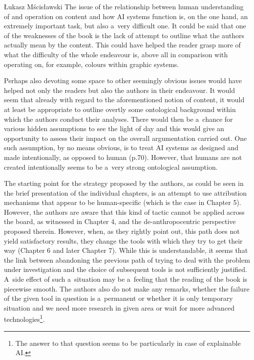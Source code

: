 \begin{newrevengenv}{Łukasz Mścisławski}
The issue of the relationship between human understanding of and operation on content and how AI systems function is, on the one hand, an extremely important task, but also a~very difficult one. It could be said that one of the weaknesses of the book is the lack of attempt to outline what the authors actually mean by the content. This could have helped the reader grasp more of what the difficulty of the whole endeavour is, above all in comparison with operating on, for example, colours within graphic systems.

Perhaps also devoting some space to other seemingly obvious issues would have helped not only the readers but also the authors in their endeavour. It would seem that already with regard to the aforementioned notion of content, it would at least be appropriate to outline overtly some ontological background within which the authors conduct their analyses. There would then be a~chance for various hidden assumptions to see the light of day and this would give an opportunity to assess their impact on the overall argumentation carried out. One such assumption, by no means obvious, is to treat AI systems as designed and made intentionally, as opposed to human (p.70). However, that humans are not created intentionally seems to be a~very strong ontological assumption.

The starting point for the strategy proposed by the authors, as could be seen in the brief presentation of the individual chapters, is an attempt to use attribution mechanisms that appear to be human-specific (which is the case in Chapter 5). However, the authors are aware that this kind of tactic cannot be applied across the board, as witnessed in Chapter 4, and the de-anthropocentric perspective proposed therein. However, when, as they rightly point out, this path does not yield satisfactory results, they change the tools with which they try to get their way (Chapter 6 and later Chapter 7). While this is understandable, it seems that the link between abandoning the previous path of trying to deal with the problem under investigation and the choice of subsequent tools is not sufficiently justified. A~side effect of such a~situation may be a~feeling that the reading of the book is piecewise smooth. The authors also do not make any remarks, whether the failure of the given tool in question is a~permanent or whether it is only temporary situation and we need more research in given area or wait for more advanced technologies\footnote{The answer to that question seems to be particularly in case of explainable AI.}.


\end{newrevengenv}
